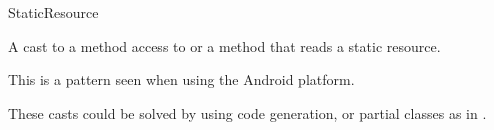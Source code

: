 
\begin{pattern}{StaticResource}
    
A cast to a method access to  or a method that reads a
static resource.

This is a pattern seen when using the Android platform. 



\discussion

These casts could be solved by using code generation,
or partial classes as in \csharp{}.

\end{pattern}